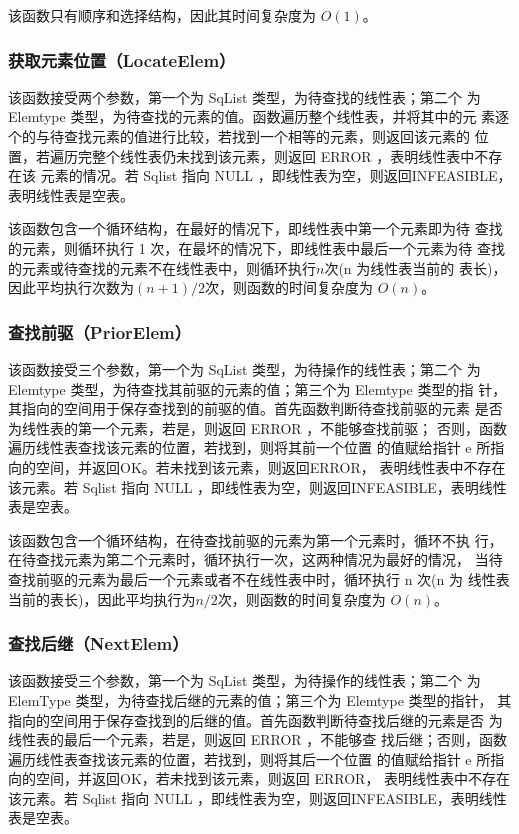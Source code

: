 \documentclass[supercite]{Experimental_Report}
\theoremstyle{definition}
\begin{document}
该函数只有顺序和选择结构，因此其时间复杂度为 $O(1)$。
\subsubsection{获取元素位置（LocateElem）}
该函数接受两个参数，第一个为 SqList 类型，为待查找的线性表；第二个
为 Elemtype 类型，为待查找的元素的值。函数遍历整个线性表，并将其中的元
素逐个的与待查找元素的值进行比较，若找到一个相等的元素，则返回该元素的
位置，若遍历完整个线性表仍未找到该元素，则返回 ERROR ，表明线性表中不存在该
元素的情况。若 Sqlist 指向 NULL ，即线性表为空，则返回INFEASIBLE，表明线性表是空表。

该函数包含一个循环结构，在最好的情况下，即线性表中第一个元素即为待
查找的元素，则循环执行 1 次，在最坏的情况下，即线性表中最后一个元素为待
查找的元素或待查找的元素不在线性表中，则循环执行$n$次(n 为线性表当前的
表长)，因此平均执行次数为$(n+1)/2$次，则函数的时间复杂度为 $O(n)$。

\subsubsection{查找前驱（PriorElem）}
该函数接受三个参数，第一个为 SqList 类型，为待操作的线性表；第二个
为 Elemtype 类型，为待查找其前驱的元素的值；第三个为 Elemtype 类型的指
针，其指向的空间用于保存查找到的前驱的值。首先函数判断待查找前驱的元素
是否为线性表的第一个元素，若是，则返回 ERROR ，不能够查找前驱；
否则，函数遍历线性表查找该元素的位置，若找到，则将其前一个位置
的值赋给指针 e 所指向的空间，并返回OK。若未找到该元素，则返回ERROR，
表明线性表中不存在该元素。若 Sqlist 指向 NULL ，即线性表为空，则返回INFEASIBLE，表明线性表是空表。

该函数包含一个循环结构，在待查找前驱的元素为第一个元素时，循环不执
行，在待查找元素为第二个元素时，循环执行一次，这两种情况为最好的情况，
当待查找前驱的元素为最后一个元素或者不在线性表中时，循环执行 n 次(n 为
线性表当前的表长)，因此平均执行为$n/2$次，则函数的时间复杂度为 $O(n)$。

\subsubsection{查找后继（NextElem）}
该函数接受三个参数，第一个为 SqList 类型，为待操作的线性表；第二个
为 ElemType 类型，为待查找后继的元素的值；第三个为 Elemtype 类型的指针，
其指向的空间用于保存查找到的后继的值。首先函数判断待查找后继的元素是否
为线性表的最后一个元素，若是，则返回 ERROR ，不能够查
找后继；否则，函数遍历线性表查找该元素的位置，若找到，则将其后一个位置
的值赋给指针 e 所指向的空间，并返回OK，若未找到该元素，则返回 ERROR，
表明线性表中不存在该元素。若 Sqlist 指向 NULL ，即线性表为空，则返回INFEASIBLE，表明线性表是空表。
\end{document}
